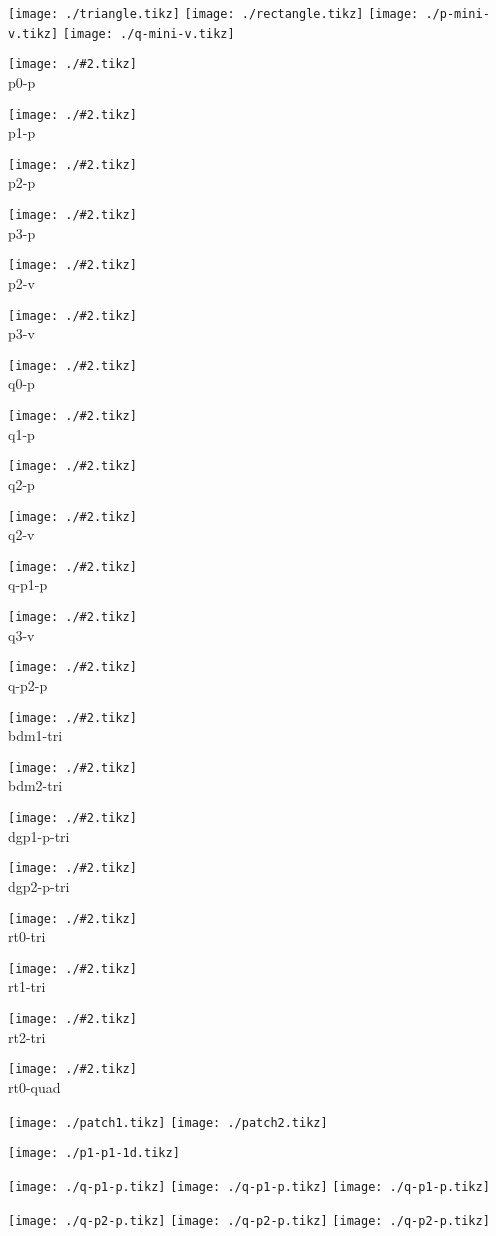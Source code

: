 \documentclass{article}
\newcommand{\showtikz}[2]{\begin{minipage}{#1\textwidth}
    \begin{center}
      \texttt{[image: ./\#2.tikz]}
      \\
      #2
    \end{center}
  \end{minipage}
}
\begin{document}
\texttt{[image: ./triangle.tikz]}
\texttt{[image: ./rectangle.tikz]}
\texttt{[image: ./p-mini-v.tikz]}
\texttt{[image: ./q-mini-v.tikz]}

\showtikz{.24}{p0-p}
\showtikz{.24}{p1-p}
\showtikz{.24}{p2-p}
\showtikz{.24}{p3-p}

\showtikz{.24}{p2-v}
\showtikz{.24}{p3-v}

\showtikz{.24}{q0-p}
\showtikz{.24}{q1-p}
\showtikz{.24}{q2-p}

\showtikz{.24}{q2-v}
\showtikz{.24}{q-p1-p}
\showtikz{.24}{q3-v}
\showtikz{.24}{q-p2-p}

\showtikz{.24}{bdm1-tri}
\showtikz{.24}{bdm2-tri}
\showtikz{.24}{dgp1-p-tri}
\showtikz{.24}{dgp2-p-tri}

\showtikz{.24}{rt0-tri}
\showtikz{.24}{rt1-tri}
\showtikz{.24}{rt2-tri}

\showtikz{.24}{rt0-quad}

\texttt{[image: ./patch1.tikz]}
\texttt{[image: ./patch2.tikz]}

\texttt{[image: ./p1-p1-1d.tikz]}

\texttt{[image: ./q-p1-p.tikz]}
\texttt{[image: ./q-p1-p.tikz]}
\texttt{[image: ./q-p1-p.tikz]}

\texttt{[image: ./q-p2-p.tikz]}
\texttt{[image: ./q-p2-p.tikz]}
\texttt{[image: ./q-p2-p.tikz]}

\end{document}
